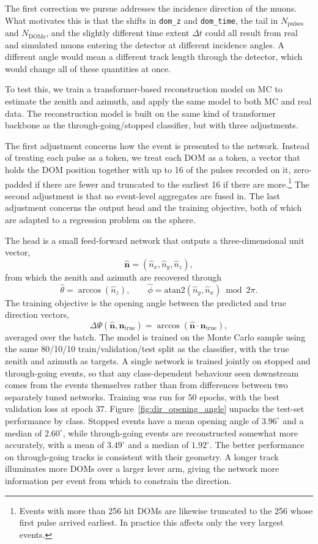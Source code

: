 The first correction we pursue addresses the incidence direction of the muons. What motivates this is that the shifts in \texttt{dom\_z} and \texttt{dom\_time}, the tail in $N_{\mathrm{pulses}}$ and $N_{\mathrm{DOMs}}$, and the slightly different time extent $\Delta t$ could all result from real and simulated muons entering the detector at different incidence angles. A different angle would mean a different track length through the detector, which would change all of these quantities at once.


To test this, we train a transformer-based reconstruction model on MC to estimate the zenith and azimuth, and apply the same model to both MC and real data. The reconstruction model is built on the same kind of transformer backbone as the through-going/stopped classifier, but with three adjustments.

The first adjustment concerns how the event is presented to the network. Instead of treating each pulse as a token, we treat each DOM as a token, a vector that holds the DOM position together with up to 16 of the pulses recorded on it, zero-padded if there are fewer and truncated to the earliest 16 if there are more.\footnote{Events with more than 256 hit DOMs are likewise truncated to the 256 whose first pulse arrived earliest. In practice this affects only the very largest events.} The second adjustment is that no event-level aggregates are fused in. The last adjustment concerns the output head and the training objective, both of which are adapted to a regression problem on the sphere.

The head is a small feed-forward network that outputs a three-dimensional unit vector,
\[
    \hat{\mathbf{n}} = (\hat{n}_x,\hat{n}_y,\hat{n}_z),
\]
from which the zenith and azimuth are recovered through
\[
    \hat{\theta} = \arccos(\hat{n}_z),
    \qquad
    \hat{\phi} = \mathrm{atan2}(\hat{n}_y,\hat{n}_x) \bmod 2\pi.
\]
The training objective is the opening angle between the predicted and true direction vectors,
\[
    \Delta\Psi(\hat{\mathbf{n}},\mathbf{n}_{\mathrm{true}})
    =
    \arccos(\hat{\mathbf{n}} \cdot \mathbf{n}_{\mathrm{true}}),
\]
averaged over the batch. The model is trained on the Monte Carlo sample using the same 80/10/10 train/validation/test split as the classifier, with the true zenith and azimuth as targets. A single network is trained jointly on stopped and through-going events, so that any class-dependent behaviour seen downstream comes from the events themselves rather than from differences between two separately tuned networks. Training was run for 50 epochs, with the best validation loss at epoch 37. Figure~\ref{fig:dir_opening_angle} unpacks the test-set performance by class. Stopped events have a mean opening angle of $3.96^{\circ}$ and a median of $2.60^{\circ}$, while through-going events are reconstructed somewhat more accurately, with a mean of $3.49^{\circ}$ and a median of $1.92^{\circ}$. The better performance on through-going tracks is consistent with their geometry. A longer track illuminates more DOMs over a larger lever arm, giving the network more information per event from which to constrain the direction.

